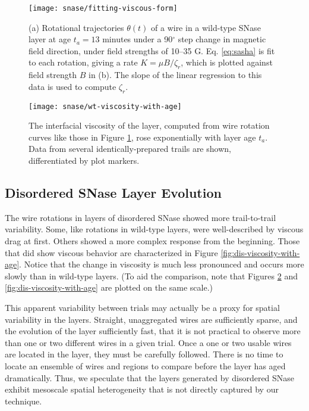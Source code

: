    \begin{figure}
    \centering
    \texttt{[image: snase/fitting-viscous-form]} %
    \caption{\label{fig:fitting-viscous-form}(a) Rotational trajectories $\theta(t)$ of a wire in a wild-type SNase layer at age $t_a=13$ minutes under a 90$^\circ$ step change in magnetic field direction, under field strengths of 10--35 G. Eq. \ref{eq:sasha} is fit to each rotation, giving a rate $K=\mu B/\zeta_r$, which is plotted against field strength $B$ in (b). The slope of the linear regression to this data is used to compute $\zeta_r$.}
    \end{figure}

   \begin{figure}
    \centering
    \texttt{[image: snase/wt-viscosity-with-age]}
    \caption{\label{fig:wt-viscosity-with-age}The interfacial viscosity of the layer, computed from wire rotation curves like those in Figure \ref{fig:fitting-viscous-form}, rose exponentially with layer age $t_a$. Data from several identically-prepared trails are shown, differentiated by plot markers.}
    \end{figure}
   

\subsection{Disordered SNase Layer Evolution}

The wire rotations in layers of disordered SNase showed more trail-to-trail variability. Some, like rotations in wild-type layers, were well-described by viscous drag at first. Others showed a more complex response from the beginning. Those that did show viscous behavior are characterized in Figure \ref{fig:dis-viscosity-with-age}. Notice that the change in viscosity is much less pronounced and occurs more slowly than in wild-type layers. (To aid the comparison, note that Figures \ref{fig:wt-viscosity-with-age} and \ref{fig:dis-viscosity-with-age} are plotted on the same scale.)

This apparent variability between trials may actually be a proxy for spatial variability in the layers. Straight, unaggregated wires are sufficiently sparse, and the evolution of the layer sufficiently fast, that it is not practical to observe more than one or two different wires in a given trial. Once a one or two usable wires are located in the layer, they must be carefully followed. There is no time to locate an ensemble of wires and regions to compare before the layer has aged dramatically. Thus, we speculate that the layers generated by disordered SNase exhibit mesoscale spatial heterogeneity that is not directly captured by our technique.

